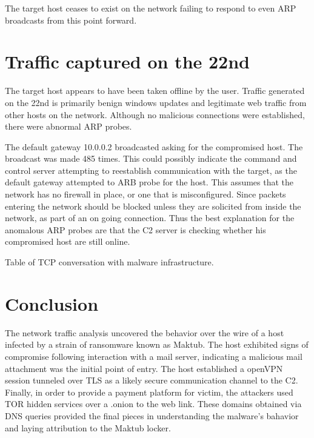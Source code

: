 \documentclass[11pt]{diazessay} %
\begin{document}
The target host ceases to exist on the network failing to respond to even ARP broadcasts from this point forward. 


\section*{Traffic captured on the 22nd}

The target host appears to have been taken offline by the user. Traffic generated on the 22nd is primarily benign windows updates and legitimate web traffic from other hosts on the network. Although no malicious connections were established, there were abnormal ARP probes.

The default gateway 10.0.0.2 broadcasted asking for the compromised host. The broadcast was made 485 times. This could possibly indicate the command and control server attempting to reestablish communication with the target, as the default gateway attempted to ARB probe for the host. This assumes that the network has no firewall in place, or one that is misconfigured. Since packets entering the network should be blocked unless they are solicited from inside the network, as part of an on going connection. Thus the best explanation for the anomalous ARP probes are that the C2 server is checking whether his compromised host are still online.

Table of TCP conversation with malware infrastructure.



\section*{Conclusion}

The network traffic analysis uncovered the behavior over the wire of a host infected by a strain of ransomware known as Maktub. The host exhibited signs of compromise following interaction with a mail server, indicating a malicious mail attachment was the initial point of entry. The host established a openVPN session tunneled over TLS as a likely secure communication channel to the C2. Finally, in order to provide a payment platform for victim, the attackers used TOR hidden services over a .onion to the web link. These domains obtained via DNS queries provided the final pieces in understanding the malware's bahavior and laying attribution to the Maktub locker.
\end{document}
